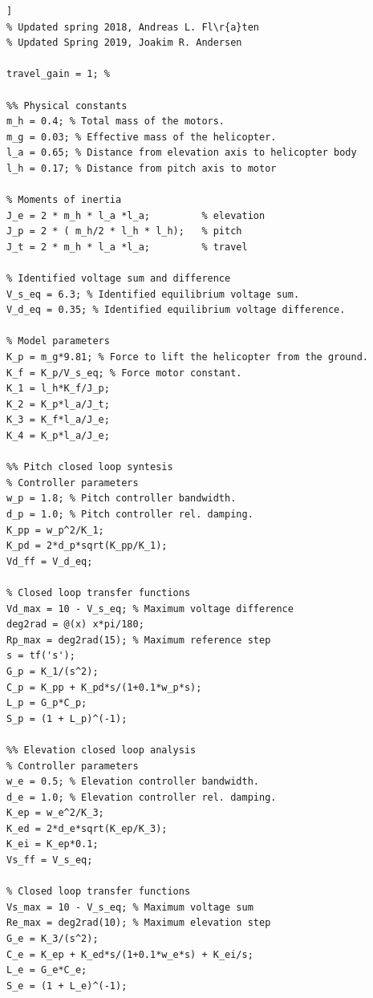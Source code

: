 \begin{lstlisting}[caption={init.m}]]
% Updated spring 2018, Andreas L. Fl\r{a}ten
% Updated Spring 2019, Joakim R. Andersen

travel_gain = 1; %

%% Physical constants
m_h = 0.4; % Total mass of the motors.
m_g = 0.03; % Effective mass of the helicopter.
l_a = 0.65; % Distance from elevation axis to helicopter body
l_h = 0.17; % Distance from pitch axis to motor

% Moments of inertia
J_e = 2 * m_h * l_a *l_a;         % elevation
J_p = 2 * ( m_h/2 * l_h * l_h);   % pitch
J_t = 2 * m_h * l_a *l_a;         % travel

% Identified voltage sum and difference
V_s_eq = 6.3; % Identified equilibrium voltage sum.
V_d_eq = 0.35; % Identified equilibrium voltage difference.

% Model parameters
K_p = m_g*9.81; % Force to lift the helicopter from the ground.
K_f = K_p/V_s_eq; % Force motor constant.
K_1 = l_h*K_f/J_p;
K_2 = K_p*l_a/J_t;
K_3 = K_f*l_a/J_e;
K_4 = K_p*l_a/J_e;

%% Pitch closed loop syntesis
% Controller parameters
w_p = 1.8; % Pitch controller bandwidth.
d_p = 1.0; % Pitch controller rel. damping.
K_pp = w_p^2/K_1;
K_pd = 2*d_p*sqrt(K_pp/K_1);
Vd_ff = V_d_eq;

% Closed loop transfer functions
Vd_max = 10 - V_s_eq; % Maximum voltage difference
deg2rad = @(x) x*pi/180;
Rp_max = deg2rad(15); % Maximum reference step
s = tf('s');
G_p = K_1/(s^2);
C_p = K_pp + K_pd*s/(1+0.1*w_p*s);
L_p = G_p*C_p;
S_p = (1 + L_p)^(-1);

%% Elevation closed loop analysis
% Controller parameters
w_e = 0.5; % Elevation controller bandwidth.
d_e = 1.0; % Elevation controller rel. damping.
K_ep = w_e^2/K_3;
K_ed = 2*d_e*sqrt(K_ep/K_3);
K_ei = K_ep*0.1;
Vs_ff = V_s_eq;

% Closed loop transfer functions
Vs_max = 10 - V_s_eq; % Maximum voltage sum
Re_max = deg2rad(10); % Maximum elevation step
G_e = K_3/(s^2);
C_e = K_ep + K_ed*s/(1+0.1*w_e*s) + K_ei/s;
L_e = G_e*C_e;
S_e = (1 + L_e)^(-1);
\end{lstlisting}





